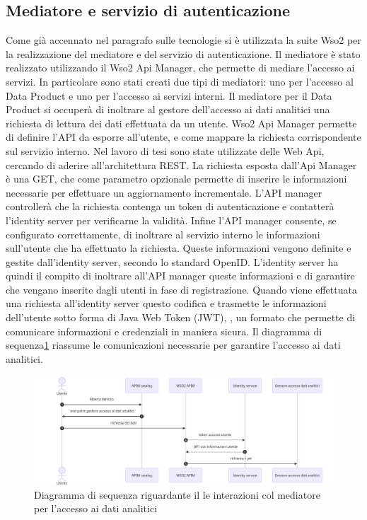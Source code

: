 \documentclass[12pt]{report}
\begin{document}
\subsection{Mediatore e servizio di autenticazione}
Come già accennato nel paragrafo sulle tecnologie si è utilizzata la suite Wso2 per la realizzazione del mediatore e del servizio di autenticazione.
Il mediatore è stato realizzato utilizzando il Wso2 Api Manager, che permette di mediare l'accesso ai servizi.
In particolare sono stati creati due tipi di mediatori: uno per l'accesso al Data Product e uno per l'accesso ai servizi interni.
Il mediatore per il Data Product si occuperà di inoltrare al gestore dell'accesso ai dati analitici una richiesta di lettura dei dati effettuata da un utente.
Wso2 Api Manager permette di definire l'API da esporre all'utente, e come mappare la richiesta corrispondente sul servizio interno. 
Nel lavoro di tesi sono state utilizzate delle Web Api, cercando di aderire all'architettura REST.
La richiesta esposta dall'Api Manager è una GET, che come parametro opzionale permette di inserire le informazioni necessarie per effettuare un aggiornamento incrementale.
L'API manager controllerà che la richiesta contenga un token di autenticazione e contatterà l'identity server per verificarne la validità.
Infine l'API manager consente, se configurato correttamente, di inoltrare al servizio interno le informazioni sull'utente che ha effettuato la richiesta. 
Queste informazioni vengono definite e gestite dall'identity server, secondo lo standard OpenID.
L'identity server ha quindi il compito di inoltrare all'API manager queste informazioni e di garantire che vengano inserite dagli utenti in fase di registrazione.
Quando viene effettuata una richiesta all'identity server questo codifica e trasmette le informazioni dell'utente sotto forma di Java Web Token (JWT), \cite{jwt_documentation}, un formato che permette di comunicare informazioni e credenziali in maniera sicura.
Il diagramma di sequenza\ref{funzionamento mediatore} riassume le comunicazioni necessarie per garantire l'accesso ai dati analitici.
\begin{figure}
    \centering
    \includegraphics[width=\linewidth]{immagini/Funzionamento mediatore dati analitci.png}
    \caption{Diagramma di sequenza riguardante il le interazioni col mediatore per l'accesso ai dati analitici}
    \label{funzionamento mediatore}
\end{figure}
\end{document}
